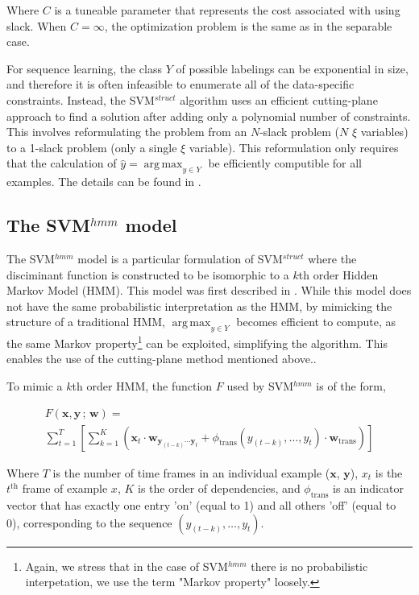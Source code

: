 \documentclass{article}
\DeclareMathOperator*{\argmax}{arg\,max}
\begin{document}
Where $C$ is a tuneable parameter that represents the cost associated with
using slack. When $C = \infty$, the optimization problem is the same as in
the separable case.

For sequence learning, the class $Y$ of possible labelings can be exponential
in size, and therefore it is often infeasible to enumerate all of the
data-specific constraints. Instead, the SVM$^{struct}$ algorithm uses an
efficient cutting-plane approach to find a solution after adding only a
polynomial number of constraints. This involves reformulating the problem from
an $N$-slack problem ($N$ $\xi$ variables) to a 1-slack problem (only a single
$\xi$ variable). This reformulation only requires that the calculation of
$\hat{y} = \argmax_{y \in Y}$ be efficiently computible for all examples. The
details can be found in \cite{joachims2009cutting}.

\subsection{The SVM$^{hmm}$ model}

The SVM$^{hmm}$ model is a particular formulation of SVM$^{struct}$ where the
disciminant function is constructed to be isomorphic to a $k$th order Hidden
Markov Model (HMM). This model was first described in
\cite{altun2003hidden}. While this model does not have the same
probabilistic interpretation as the HMM, by mimicking the structure of a
traditional HMM, $\argmax_{y \in Y}$ becomes efficient to compute, as the same
Markov property\footnote{Again, we stress that in the case of SVM$^{hmm}$ there
is no probabilistic interpetation, we use the term "Markov property" loosely.}
can be exploited, simplifying the algorithm. This enables the use of the
cutting-plane method mentioned above..

To mimic a $k$th order HMM, the function $F$ used by SVM$^{hmm}$ is of the
form,

  \[
    \begin{split}
    F(\mathbf{x}, \mathbf{y}\,;\,\mathbf{w}) = \\
    \sum_{t=1}^{T} \left[
      \sum_{k=1}^{K}\left(
        \mathbf{x}_{t} \cdot
        \mathbf{w}_{\mathbf{y}_{(t-k)} \dotsm \mathbf{y}_{t}} +
        \phi_{\text{trans}}(y_{(t-k)},\dots,y_{t}) \cdot
        \mathbf{w}_{\text{trans}}
      \right)
    \right] 
  \end{split}
  \]

Where $T$ is the number of time frames in an individual example ($\mathbf{x}$,
$\mathbf{y}$), $x_t$ is the $t^{\text{th}}$ frame of example $x$, $K$ is the
order of dependencies, and $\phi_{\text{trans}}$ is an indicator vector that
has exactly one entry 'on' (equal to 1) and all others 'off' (equal to 0),
corresponding to the sequence $(y_{(t-k)},\dots,y_{t})$.
\end{document}
